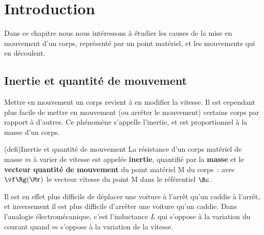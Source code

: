\documentclass[../../main/main.tex]{subfiles}
\begin{document}
\vfill

\newpage

\vspace*{\fill}
\minitoc
\vspace*{\fill}

\newpage

\section{Introduction}
Dans ce chapitre nous nous intéressons à étudier les causes de la mise en
mouvement d'un corps, représenté par un point matériel, et les mouvements qui en
découlent.

\subsection{Inertie et quantité de mouvement}
Mettre en mouvement un corps revient à en modifier la vitesse. Il est cependant
plus facile de mettre en mouvement (ou arrêter le mouvement) certains corps par
rapport à d'autres. Ce phénomène s'appelle l'inertie, et est
proportionnel à la masse d'un corps.

\begin{tcb*}(defi){Inertie et quantité de mouvement}
	La résistance d'un corps matériel de masse $m$ à varier de vitesse est
	appelée \textbf{inertie}, quantifié par la \textbf{masse} et le
	\textbf{vecteur quantité de mouvement} du point matériel M du corps~:
	\psw{
		\[
			\boxed{\pf\Rg(\Mr) = m\vf\Rg(\Mr)}
		\]
	}
	avec $\vf\Rg(\Mr)$ le vecteur vitesse du point M dans le référentiel $\Rc$.
\end{tcb*}

Il est en effet plus difficile de déplacer une voiture à l'arrêt qu'un caddie à
l'arrêt, et inversement il est plus difficile d'arrêter une voiture qu'un
caddie. Dans l'analogie électromécanique, c'est l'inductance $L$ qui s'oppose à
la variation du courant quand $m$ s'oppose à la variation de la vitesse.
\end{document}

